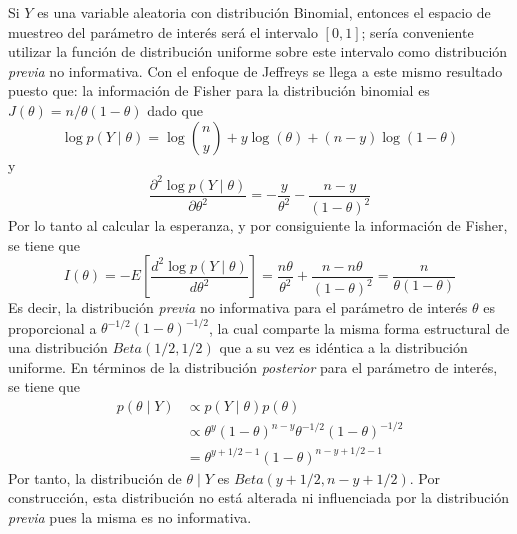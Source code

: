 \documentclass[10pt,openright]{book}\usepackage[]{graphicx}\usepackage[]{color}
\begin{document}
\begin{Eje}
Si $Y$ es una variable aleatoria con distribución Binomial, entonces el espacio de muestreo del parámetro de interés será el intervalo $[0,1]$; sería conveniente utilizar la función de distribución uniforme sobre este intervalo como distribución \emph{previa} no informativa. Con el enfoque de Jeffreys se llega a este mismo resultado puesto que: la información de Fisher para la distribución binomial es $J(\theta)=n/\theta(1- \theta)$ dado que
\begin{equation*}
\log p(Y \mid \theta)=\log \binom{n}{y} + y\log(\theta)+(n-y)\log(1-\theta)
\end{equation*}
y
\begin{equation*}
\frac{\partial^2 \log p(Y \mid \theta)}{\partial\theta^2}=-\frac{y}{\theta^2}-\frac{n-y}{(1-\theta)^2}
\end{equation*}
Por lo tanto al calcular la esperanza, y por consiguiente la información de Fisher, se tiene que
\begin{equation*}
I(\theta)=- E\left[\frac{d^2 \log p(Y \mid \theta)}{d\theta^2}\right]
=\frac{n\theta}{\theta^2}+\frac{n-n\theta}{(1-\theta)^2}= \frac{n}{\theta(1-\theta)}
\end{equation*}
Es decir, la distribución \emph{previa} no informativa para el parámetro de interés $\theta$ es proporcional a $\theta^{-1/2}(1-\theta)^{-1/2}$, la cual comparte la misma forma estructural de una distribución $Beta(1/2,1/2)$ que a su vez es idéntica a la distribución uniforme.  En términos de la distribución \emph{posterior} para el parámetro de interés, se tiene que
\begin{align*}
p(\theta \mid Y) &\propto p(Y \mid \theta) p(\theta)\\
&\propto \theta^{y}(1-\theta)^{n-y}\theta^{-1/2}(1-\theta)^{-1/2}\\
&=\theta^{y+1/2-1}(1-\theta)^{n-y+1/2-1}
\end{align*}
Por tanto, la distribución de $\theta \mid Y$ es $Beta(y+1/2,n-y+1/2)$. Por construcción, esta distribución no está alterada ni influenciada por la distribución \emph{previa} pues la misma es no informativa.
\end{Eje}
\end{document}
